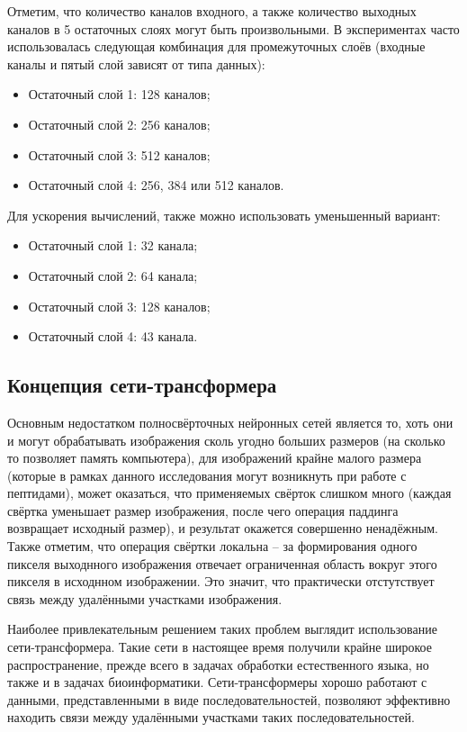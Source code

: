Отметим, что количество каналов входного, а также количество выходных каналов в 5 остаточных слоях могут быть произвольными. В экспериментах часто использовалась следующая комбинация для промежуточных слоёв (входные каналы и пятый слой зависят от типа данных):
\begin{itemize}
\item Остаточный слой 1: 128 каналов;
\item Остаточный слой 2: 256 каналов;
\item Остаточный слой 3: 512 каналов;
\item Остаточный слой 4: 256, 384 или 512 каналов.
\end{itemize}
Для ускорения вычислений, также можно использовать уменьшенный вариант:
\begin{itemize}
\item Остаточный слой 1: 32 канала;
\item Остаточный слой 2: 64 канала;
\item Остаточный слой 3: 128 каналов;
\item Остаточный слой 4: 43 канала.
\end{itemize}

\subsection{Концепция сети-трансформера}
Основным недостатком полносвёрточных нейронных сетей является то, хоть они и могут обрабатывать изображения сколь угодно больших размеров (на сколько то позволяет память компьютера), для изображений крайне малого размера (которые в рамках данного исследования могут возникнуть при работе с пептидами), может оказаться, что применяемых свёрток слишком много (каждая свёртка уменьшает размер изображения, после чего операция паддинга возвращает исходный размер), и результат окажется совершенно ненадёжным. Также отметим, что операция свёртки локальна -- за формирования одного пикселя выходнного изображения отвечает ограниченная область вокруг этого пикселя в исходнном изображении. Это значит, что практически отстутствует связь между удалёнными участками изображения.

Наиболее привлекательным решением таких проблем выглядит использование сети-трансформера\cite{attention_all_you_need}. Такие сети в настоящее время получили крайне широкое распространение, прежде всего в задачах обработки естественного языка, но также и в задачах биоинформатики. Сети-трансформеры хорошо работают с данными, представленными в виде последовательностей, позволяют эффективно находить связи между удалёнными участками таких последовательностей.

